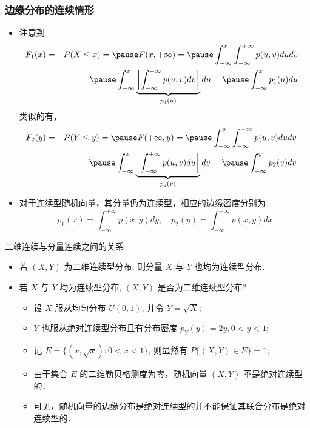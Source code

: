 \documentclass[Prob-All.tex]{subfiles}
\begin{document}
\begin{frame}
	\frametitle{边缘分布的连续情形}
	\begin{itemize}[<+-|alert@+>]
		\item 注意到
		\vspace{-0.4cm}\begin{eqnarray*}
			\hspace{-0.3cm}F_1(x)&=&P(X\le x)=\pause F(x,+\infty)=\pause \int_{-\infty}^x\int_{-\infty}^{+\infty}p(u,v)dudv\\
			&=&\pause \int_{-\infty}^x\underbrace{\left[\int_{-\infty}^{+\infty}p(u,v)dv\right]}_{p_1(u)}du=\pause \int_{-\infty}^xp_1(u)du
		\end{eqnarray*}
		\vspace{-0.4cm}   \pause  类似的有，\begin{eqnarray*}
			\hspace{-0.3cm}F_2(y)&=&P(Y\le y)=\pause F(+\infty,y)=\pause \int_{-\infty}^y\int_{-\infty}^{+\infty}p(u,v)dudv\\
			&=&\pause \int_{-\infty}^x\underbrace{\left[\int_{-\infty}^{+\infty}p(u,v)du\right]}_{p_2(v)}dv=\pause \int_{-\infty}^yp_2(v)dv
		\end{eqnarray*}
\item 对于连续型随机向量，其分量仍为连续型，相应的边缘密度分别为 $$p_1 (x)=\int_{-\infty}^{+\infty} p (x,y) dy,\quad  p_2 (y)=\int_{-\infty}^{+\infty} p (x,y) dx$$
\end{itemize}
\end{frame}
\begin{frame}{二维连续与分量连续之间的关系}
\begin{itemize}[<+-|alert@+>]
\item 若 $(X, Y)$ 为二维连续型分布, 则分量 $X$ 与 $Y$ 也均为连续型分布.
\item 若  $X$ 与 $Y$ 均为连续型分布, $(X,Y)$ 是否为二维连续型分布?
\begin{itemize}[<+-|alert@+>]
\item 设 $X$ 服从均匀分布 $U(0,1)$, 并令 $Y=\sqrt{X}$;
\item $Y$ 也服从绝对连续型分布且有分布密度 $p_{Y}(y)=2 y, 0<y<1$;
\item 记 $E=\{(x, \sqrt{x}): 0<x<1\}$, 则显然有 $P\{(X, Y) \in E\}=1$;
\item 由于集合 $E$ 的二维勒贝格测度为零，随机向量 $(X, Y)$ 不是绝对连续型的．
\item 可见，随机向量的边缘分布是绝对连续型的并不能保证其联合分布是绝对连续型的．
\end{itemize}

\end{itemize}

\end{frame}
\end{document}
